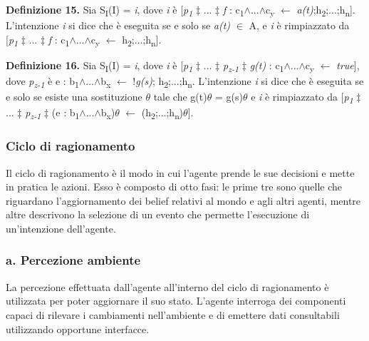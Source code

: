 \smallskip
\textbf{Definizione 15.} Sia S\textsubscript{I}(I) = \textit{i}, dove \textit{i} \`e [\textit{p\textsubscript{1}} $\ddagger$ ... $\ddagger$ \textit{f} : c\textsubscript{1}$\land$...$\land$c\textsubscript{y} $\leftarrow$ \textit{a(t)};h\textsubscript{2};...;h\textsubscript{n}]. L'intenzione \textit{i} si dice che \`e eseguita  se e solo se \textit{a(t)} $\in$ A, e \textit{i} \`e rimpiazzato da [\textit{p\textsubscript{1}} $\ddagger$ ... $\ddagger$ \textit{f} : c\textsubscript{1}$\land$...$\land$c\textsubscript{y} $\leftarrow$ h\textsubscript{2};...;h\textsubscript{n}].

\smallskip
\textbf{Definizione 16.} Sia S\textsubscript{I}(I) = \textit{i}, dove \textit{i} \`e [\textit{p\textsubscript{1}} $\ddagger$ ... $\ddagger$ \textit{p\textsubscript{z-1}} $\ddagger$ \textit{g(t)} : c\textsubscript{1}$\land$...$\land$c\textsubscript{y} $\leftarrow$ \textit{true}], dove \textit{p\textsubscript{z-1}} \`e e : b\textsubscript{1}$\land$...$\land$b\textsubscript{x} $\leftarrow$ !\textit{g(s)}; h\textsubscript{2};...;h\textsubscript{n}. L'intenzione \textit{i} si dice che \`e eseguita  se e solo se esiste una sostituzione \textit{$\theta$} tale che g(t)\textit{$\theta$} = g(s)\textit{$\theta$} e \textit{i} \`e rimpiazzato da [\textit{p\textsubscript{1}} $\ddagger$ ... $\ddagger$ \textit{p\textsubscript{z-1}} $\ddagger$ (e : b\textsubscript{1}$\land$...$\land$b\textsubscript{x})\textit{$\theta$} $\leftarrow$ (h\textsubscript{2};...;h\textsubscript{n})\textit{$\theta$}].



\subsubsection{Ciclo di ragionamento}
Il ciclo di ragionamento \`e il modo in cui l'agente prende le sue decisioni e mette in pratica le azioni. Esso \`e composto di otto fasi: le prime tre sono quelle che riguardano l'aggiornamento dei belief relativi al mondo e agli altri agenti, mentre altre descrivono la selezione di un evento che permette l'esecuzione di un'intenzione dell'agente.

\subsubsection{a. Percezione ambiente}
La percezione effettuata dall'agente all'interno del ciclo di ragionamento \`e utilizzata per poter aggiornare il suo stato. L'agente interroga dei componenti capaci di rilevare i cambiamenti nell'ambiente e di emettere dati consultabili utilizzando opportune interfacce.

